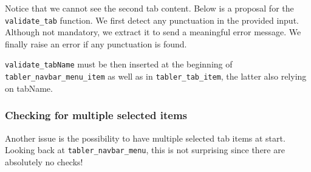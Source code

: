\documentclass[
]{book}
\newenvironment{Shaded}{\begin{snugshade}}{\end{snugshade}}
\newcommand{\CommentTok}[1]{\textcolor[rgb]{0.56,0.35,0.01}{\textit{#1}}}
\newcommand{\ControlFlowTok}[1]{\textcolor[rgb]{0.13,0.29,0.53}{\textbf{#1}}}
\newcommand{\DataTypeTok}[1]{\textcolor[rgb]{0.13,0.29,0.53}{#1}}
\newcommand{\DecValTok}[1]{\textcolor[rgb]{0.00,0.00,0.81}{#1}}
\newcommand{\KeywordTok}[1]{\textcolor[rgb]{0.13,0.29,0.53}{\textbf{#1}}}
\newcommand{\NormalTok}[1]{#1}
\newcommand{\OperatorTok}[1]{\textcolor[rgb]{0.81,0.36,0.00}{\textbf{#1}}}
\newcommand{\StringTok}[1]{\textcolor[rgb]{0.31,0.60,0.02}{#1}}
\begin{document}
Notice that we cannot see the second tab content. Below is a proposal for the \texttt{validate\_tab} function. We first detect any punctuation in the provided input. Although not mandatory, we extract it to send a meaningful error message.
We finally raise an error if any punctuation is found.

\begin{Shaded}
\end{Shaded}

\texttt{validate\_tabName} must be then inserted at the beginning of \texttt{tabler\_navbar\_menu\_item} as well as in \texttt{tabler\_tab\_item}, the latter also relying on tabName.

\hypertarget{checking-for-multiple-selected-items}{%
\subsubsection{Checking for multiple selected items}\label{checking-for-multiple-selected-items}}

Another issue is the possibility to have multiple selected tab items at start. Looking back at \texttt{tabler\_navbar\_menu}, this is not surprising since there are absolutely no checks!

\begin{Shaded}
\end{Shaded}
\end{document}
